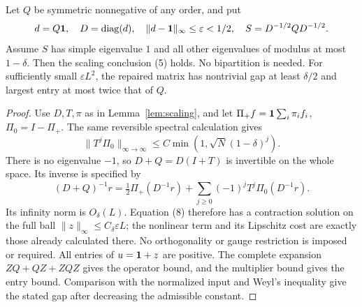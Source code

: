 \begin{lemma}
\label{lem:aperiodicrepair}
Let \(Q\) be symmetric nonnegative of any order, and put
\[
 d=Q\mathbf1,\quad D=\operatorname{diag}(d),\quad
 \|d-\mathbf1\|_\infty\leq\varepsilon<1/2,\quad
 S=D^{-1/2}QD^{-1/2}.
\]
Assume \(S\) has simple eigenvalue \(1\) and all other
eigenvalues of modulus at most \(1-\delta\).
Then the scaling conclusion (5) holds. No bipartition is needed.
For sufficiently small \(\varepsilon L^2\), the repaired matrix
has nontrivial gap at least \(\delta/2\) and largest entry at most
twice that of \(Q\).
\end{lemma}
\begin{proof}
Use \(D,T,\pi\) as in Lemma~\ref{lem:scaling}, and let
\(\Pi_+f=\mathbf1\sum_i\pi_i f_i\), \(\Pi_0=I-\Pi_+\).
The same reversible spectral calculation gives
\[
 \|T^j\Pi_0\|_{\infty\to\infty}
       \leq C\min(1,\sqrt N(1-\delta)^j).
\]
There is no eigenvalue \(-1\), so \(D+Q=D(I+T)\) is invertible
on the whole space. Its inverse is specified by
\[
 (D+Q)^{-1}r
   =\tfrac12\Pi_+(D^{-1}r)
      +\sum_{j\geq0}(-1)^jT^j\Pi_0(D^{-1}r).
\]
Its infinity norm is \(O_\delta(L)\).
Equation (8) therefore has a contraction solution on the full
ball \(\|z\|_\infty\leq C_\delta\varepsilon L\);
the nonlinear term and its Lipschitz cost are exactly those
already calculated there. No orthogonality or gauge restriction
is imposed or required.
All entries of \(u=\mathbf1+z\) are positive.
The complete expansion \(ZQ+QZ+ZQZ\) gives the operator bound,
and the multiplier bound gives the entry bound.
Comparison with the normalized input and Weyl's inequality
give the stated gap after decreasing the admissible constant.
\end{proof}

